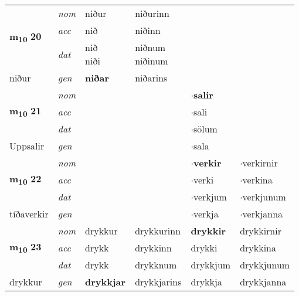 \begin{longtable}[l]{llllll}
\multirow{3}{*}{{{\textbf{m{\textsubscript{10}}} \Large{\textbf{20}}}}}  & {\footnotesize{{\textit{nom}}}} & niður & niðurinn    & \textbf{} &   \\*
 &  {\footnotesize{{\textit{acc}}}} & nið  & niðinn   &   &  \\*
 &  {\footnotesize{{\textit{dat}}}} & \specialcell{nið\\ niði} & \specialcell{niðnum\\ niðinum}   &  &  \\*
 {\footnotesize{niður}} &   {\footnotesize{{\textit{gen}}}} & \textbf{niðar}  & niðarins  &  &  \\
\cmidrule{1-6}


\multirow{3}{*}{{{\textbf{m{\textsubscript{10}}} \Large{\textbf{21}}}}}  & {\footnotesize{{\textit{nom}}}} &  &     & \textbf{$\cdot$salir} &   \\*
 &  {\footnotesize{{\textit{acc}}}} &   &    & $\cdot$sali  &  \\*
 &  {\footnotesize{{\textit{dat}}}} &  &    & $\cdot$sölum &  \\*
 {\footnotesize{Uppsalir}} &   {\footnotesize{{\textit{gen}}}} & \textbf{}  &   & $\cdot$sala &  \\
\cmidrule{1-6}


\multirow{3}{*}{{{\textbf{m{\textsubscript{10}}} \Large{\textbf{22}}}}}  & {\footnotesize{{\textit{nom}}}} &  &     & \textbf{$\cdot$verkir} & $\cdot$verkirnir  \\*
 &  {\footnotesize{{\textit{acc}}}} &   &    & $\cdot$verki  & $\cdot$verkina \\*
 &  {\footnotesize{{\textit{dat}}}} &  &    & $\cdot$verkjum & $\cdot$verkjunum \\*
 {\footnotesize{tíðaverkir}} &   {\footnotesize{{\textit{gen}}}} & \textbf{}  &   & $\cdot$verkja & $\cdot$verkjanna \\
\cmidrule{1-6}


\multirow{3}{*}{{{\textbf{m{\textsubscript{10}}} \Large{\textbf{23}}}}}  & {\footnotesize{{\textit{nom}}}} & drykkur & drykkurinn    & \textbf{drykkir} & drykkirnir  \\*
 &  {\footnotesize{{\textit{acc}}}} & drykk  & drykkinn   & drykki  & drykkina \\*
 &  {\footnotesize{{\textit{dat}}}} & drykk & drykknum   & drykkjum & drykkjunum \\*
 {\footnotesize{drykkur}} &   {\footnotesize{{\textit{gen}}}} & \textbf{drykkjar}  & drykkjarins  & drykkja & drykkjanna \\
\cmidrule{1-6}



\end{longtable}
